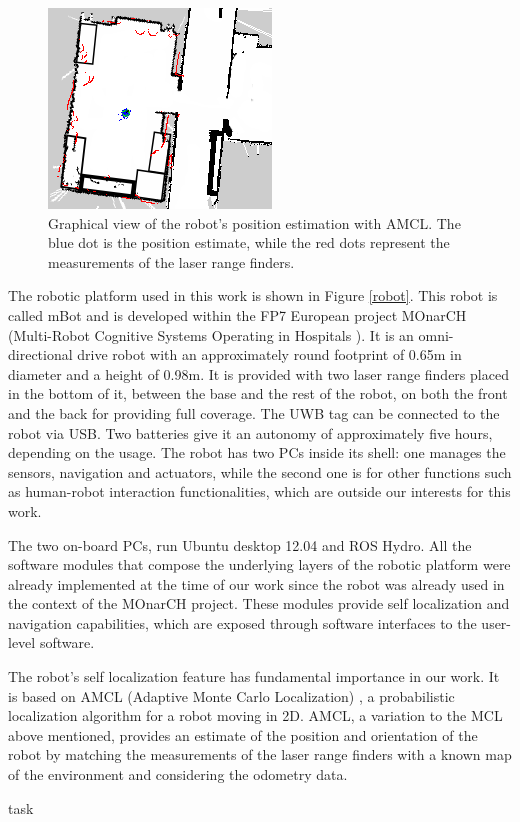
\begin{figure}
    \centering
    \includegraphics[scale=0.64]{pictures/amcl.png}
    \caption{Graphical view of the robot's position estimation with AMCL. The blue dot is the position estimate, while the red dots represent the measurements of the laser range finders.}
     \label{amcl}
\end{figure}


The robotic platform used in this work is shown in Figure \ref{robot}. This robot is called mBot \cite{Messias2014robotic} and is developed within the FP7 European project MOnarCH (Multi-Robot Cognitive Systems Operating in Hospitals \cite{monarch}).
It is an omni-directional drive robot with an approximately round footprint of 0.65m in diameter and a height of 0.98m.
It is provided with two laser range finders placed in the bottom of it, between the base and the rest of the robot, on both the front and the back for providing full coverage.
The UWB tag can be connected to the robot via USB.
Two batteries give it an autonomy of approximately five hours, depending on the usage.
The robot has two PCs inside its shell: one manages the sensors, navigation and actuators, while the second one is for other functions such as human-robot interaction functionalities, which are outside our interests for this work.

The two on-board PCs, run Ubuntu desktop 12.04 and ROS Hydro. All the software modules that compose the underlying layers of the robotic platform were already implemented at the time of our work since the robot was already used in the context of the MOnarCH  project. These modules provide self localization and navigation capabilities, which are exposed through software interfaces to the user-level software.

The robot's self localization feature has fundamental importance in our work.
It is based on AMCL (Adaptive Monte Carlo Localization) \cite{amcl}, a probabilistic localization algorithm for a robot moving in 2D.
AMCL, a variation to the MCL above mentioned, provides an estimate of the position and orientation of the robot by matching the measurements of the laser range finders with a known map of the environment and considering the odometry data.


task
